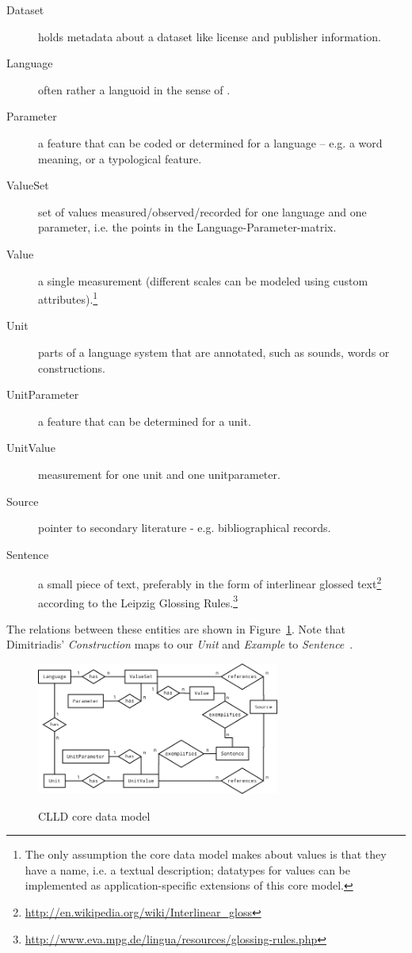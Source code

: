 \documentclass[a4paper,10pt]{article}
\begin{document}
%
%

\begin{description}
\item[Dataset] holds metadata about a dataset like license and publisher information.
\item[Language] often rather a languoid in the sense of .
\item[Parameter] a feature that can be coded or determined for a language
-- e.g. a word meaning, or a typological feature.
\item[ValueSet] set of values measured/observed/recorded for one language and one parameter,
i.e. the points in the Language-Parameter-matrix.
\item[Value] a single measurement (different scales can be modeled using custom attributes).\footnote{The only assumption
the core data model makes about values is that they have a name, i.e. a textual description;
datatypes for values can be implemented as application-specific extensions of this core model.}
\item[Unit] parts of a language system that are annotated, such as sounds, words or constructions.
\item[UnitParameter] a feature that can be determined for a unit.
\item[UnitValue] measurement for one unit and one unitparameter.
\item[Source] pointer to secondary literature - e.g. bibliographical records.
\item[Sentence] a small piece of text, preferably in the form of interlinear glossed text\footnote{\url{http://en.wikipedia.org/wiki/Interlinear\_gloss}} according to the Leipzig Glossing Rules.\footnote{\url{http://www.eva.mpg.de/lingua/resources/glossing-rules.php}}
\end{description}

The relations between these entities are shown in Figure~\ref{cllddatamodel}. Note that Dimitriadis' \emph{Construction} maps to our \emph{Unit} and \emph{Example} to \emph{Sentence}~\cite[p.~15]{burs}.

\begin{figure}[h!]
  \caption{CLLD core data model}
  \centering
\includegraphics[width=8cm]{clld_erd.png}
\label{cllddatamodel}
\end{figure}
\end{document}
